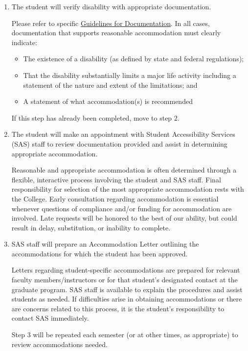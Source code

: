 \documentclass[]{article}
\providecommand{\tightlist}{%
  \setlength{\itemsep}{0pt}\setlength{\parskip}{0pt}}
\begin{document}
\begin{enumerate}
\def\labelenumi{\arabic{enumi}.}
\item
  The student will verify disability with appropriate documentation.

  Please refer to specific
  \href{http://www.wm.edu/offices/deanofstudents/services/studentaccessibilityservices/requesting-accommodations/documentation\%20/documentation\%20guidelines/index.php}{Guidelines
  for Documentation}. In all cases, documentation that supports
  reasonable accommodation must clearly indicate:

  \begin{itemize}
  \tightlist
  \item
    The existence of a disability (as defined by state and federal
    regulations);
  \item
    That the disability substantially limits a major life activity
    including a statement of the nature and extent of the limitations;
    and
  \item
    A statement of what accommodation(s) is recommended
  \end{itemize}

  If this step has already been completed, move to step 2.
\item
  The student will make an appointment with Student Accessibility
  Services (SAS) staff to review documentation provided and assist in
  determining appropriate accommodation.

  Reasonable and appropriate accommodation is often determined through a
  flexible, interactive process involving the student and SAS staff.
  Final responsibility for selection of the most appropriate
  accommodation rests with the College. Early consultation regarding
  accommodation is essential whenever questions of compliance and/or
  funding for accommodation are involved. Late requests will be honored
  to the best of our ability, but could result in delay, substitution,
  or inability to complete.
\item
  SAS staff will prepare an Accommodation Letter outlining the
  accommodations for which the student has been approved.

  Letters regarding student-specific accommodations are prepared for
  relevant faculty members/instructors or for that student's designated
  contact at the graduate program. SAS staff is available to explain the
  procedures and assist students as needed. If difficulties arise in
  obtaining accommodations or there are concerns related to this
  process, it is the student's responsibility to contact SAS
  immediately.

  Step 3 will be repeated each semester (or at other times, as
  appropriate) to review accommodations needed.
\end{enumerate}
\end{document}
